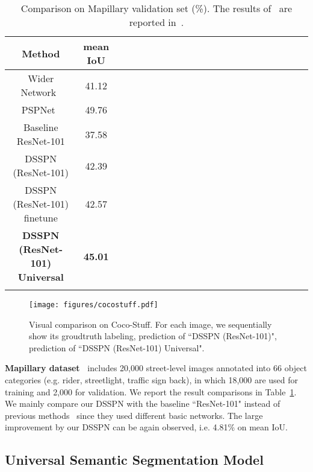 \documentclass[10pt,twocolumn,letterpaper]{article}
\begin{document}
\begin{table}[!tp]\setlength{\tabcolsep}{2pt}
	\centering\footnotesize{\caption{ Comparison on Mapillary validation set (\%). The results of~\cite{wu2016wider,zhao2016pyramid} are reported in~\cite{neuhold2017mapillary}. }\label{tab:mapillary}
	\begin{tabular}{cccccccccccccccccccccc}
		\toprule
		{Method} &  mean IoU \\
		\midrule
        Wider Network~\cite{wu2016wider}  & 41.12\\
        PSPNet~\cite{zhao2016pyramid} & 49.76\\
        Baseline ResNet-101           & 37.58\\
		\midrule
		{DSSPN (ResNet-101)} & {42.39} \\
		{DSSPN (ResNet-101) finetune} & {42.57} \\
		\textbf{DSSPN (ResNet-101) Universal} & \textbf{45.01} \\
		\hline
				\vspace{-5mm}
	\end{tabular}}
\end{table}

\begin{figure}[!tp]
		\begin{center}
			\texttt{[image: figures/cocostuff.pdf]}\vspace{-1mm}
			\caption{Visual comparison on Coco-Stuff. For each image, we sequentially show its groudtruth labeling, prediction of ``DSSPN (ResNet-101)", prediction of ``DSSPN (ResNet-101) Universal".}
			\label{fig:coco}
		\end{center}
		\vspace{-2mm}
	\end{figure}
	
\textbf{Mapillary dataset~\cite{neuhold2017mapillary}} includes 20,000 street-level images annotated into 66 object categories (e.g. rider, streetlight, traffic sign back), in which 18,000 are used for training and 2,000 for validation. We report the result comparisons in Table~\ref{tab:mapillary}. We mainly compare our DSSPN with the baseline ``ResNet-101" instead of previous methods~\cite{wu2016wider,zhao2016pyramid} since they used different basic networks. The large improvement by our DSSPN can be again observed, i.e. 4.81\% on mean IoU.

\subsection{Universal Semantic Segmentation Model}
\end{document}
